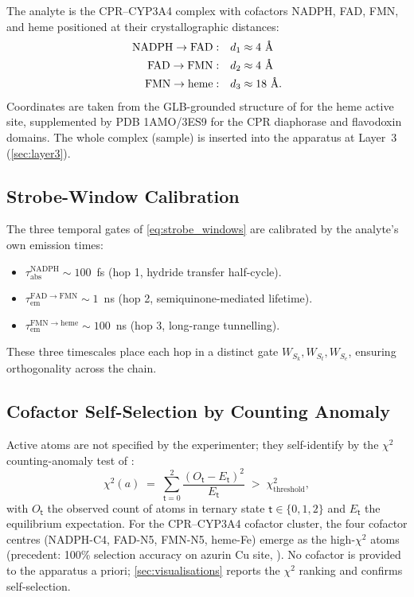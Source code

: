 \documentclass[11pt,twocolumn,a4paper]{article}
\theoremstyle{definition}
\theoremstyle{remark}
\newcommand{\tmark}{\mathsf{t}}
\begin{document}
The analyte is the CPR--CYP3A4 complex with cofactors NADPH, FAD, FMN,
and heme positioned at their crystallographic distances:
\begin{equation}
\label{eq:cofactor_distances}
\begin{aligned}
\ce{NADPH} \to \ce{FAD}: & \quad d_1 \approx 4~\text{\AA} \\
\ce{FAD} \to \ce{FMN}:   & \quad d_2 \approx 4~\text{\AA} \\
\ce{FMN} \to \ce{heme}:  & \quad d_3 \approx 18~\text{\AA}.
\end{aligned}
\end{equation}
Coordinates are taken from the GLB-grounded structure of
\citep{sachikonye2025_paper25} for the heme active site, supplemented by
PDB 1AMO/3ES9 for the CPR diaphorase and flavodoxin domains. The whole
complex (sample) is inserted into the apparatus at Layer~3
(\cref{sec:layer3}).

\subsection{Strobe-Window Calibration}
\label{sec:strobe_calib}

The three temporal gates of \cref{eq:strobe_windows} are calibrated by
the analyte's own emission times:
\begin{itemize}[nosep]
\item $\tau_{\mathrm{abs}}^{\mathrm{NADPH}} \sim 100$~fs (hop 1, hydride
transfer half-cycle).
\item $\tau_{\mathrm{em}}^{\mathrm{FAD}\to\mathrm{FMN}} \sim 1$~ns
(hop 2, semiquinone-mediated lifetime).
\item $\tau_{\mathrm{em}}^{\mathrm{FMN}\to\mathrm{heme}} \sim 100$~ns
(hop 3, long-range tunnelling).
\end{itemize}
These three timescales place each hop in a distinct gate
$W_{S_k}, W_{S_t}, W_{S_e}$, ensuring orthogonality across the chain.

\subsection{Cofactor Self-Selection by Counting Anomaly}
\label{sec:self_selection}

Active atoms are not specified by the experimenter; they self-identify
by the $\chi^2$ counting-anomaly test of \citep{sachikonye2025_atomicspec}:
\begin{equation}
\label{eq:chi2_anomaly}
\chi^2(a) \;=\; \sum_{\tmark = 0}^{2}
\frac{(O_{\tmark} - E_{\tmark})^2}{E_{\tmark}}
\;>\; \chi^2_{\mathrm{threshold}},
\end{equation}
with $O_{\tmark}$ the observed count of atoms in ternary state
$\tmark \in \{0, 1, 2\}$ and $E_{\tmark}$ the equilibrium expectation.
For the CPR--CYP3A4 cofactor cluster, the four cofactor centres
(NADPH-C4, FAD-N5, FMN-N5, heme-Fe) emerge as the high-$\chi^2$ atoms
(precedent: 100\% selection accuracy on azurin Cu site,
\citep{sachikonye2025_atomicspec}). No cofactor is provided to the
apparatus a priori; \cref{sec:visualisations} reports the $\chi^2$
ranking and confirms self-selection.
\end{document}

